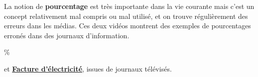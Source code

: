 \vspace*{-7mm}


\begin{debat} 
    La notion de {\bf pourcentage} est très importante dans la vie courante mais c'est un concept relativement mal compris ou mal utilisé, et on trouve régulièrement des erreurs dans les médias. Ces deux vidéos montrent des exemples de pourcentages erronés dans des journaux d'information. \\
    \begin{center}
       \textcolor{B1}{\fontsize{70}{80}\selectfont \%}
    \end{center}
    \bigskip
    \begin{cadre}[B2][J4]
       \begin{center}
           et \href{https://www.youtube.com/watch?v=gLbsxj8mv-U}{\bf Facture d'électricité}, issues de journaux télévisés.
       \end{center}
    \end{cadre}
 \end{debat}